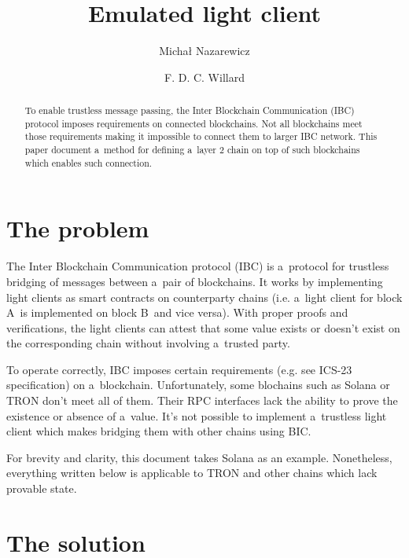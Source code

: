\documentclass[sigplan,screen,authorversion]{acmart}
\begin{document}
\title{Emulated light client}

\author{Michał Nazarewicz}

\author{F. D. C. Willard}

\renewcommand{\shortauthors}{Nazarewicz, et al.}

\begin{abstract}
  To enable trustless message passing, the Inter Blockchain
  Communication (IBC) protocol imposes requirements on connected
  blockchains.  Not all blockchains meet those requirements making it
  impossible to connect them to larger IBC network.  This paper
  document a~method for defining a~layer 2 chain on top of such
  blockchains which enables such connection.
\end{abstract}

\maketitle

\section{The problem}

The Inter Blockchain Communication protocol (IBC) is a~protocol for
trustless bridging of messages between a~pair of blockchains.  It
works by implementing light clients as smart contracts on counterparty
chains (i.e. a~light client for block A~is implemented on block B~and
vice versa).  With proper proofs and verifications, the light clients
can attest that some value exists or doesn’t exist on the
corresponding chain without involving a~trusted party.

To operate correctly, IBC imposes certain requirements (e.g. see
ICS-23 specification) on a~blockchain.  Unfortunately, some blochains
such as Solana or TRON don’t meet all of them.  Their RPC interfaces
lack the ability to prove the existence or absence of a~value.  It’s
not possible to implement a~trustless light client which makes
bridging them with other chains using BIC.

For brevity and clarity, this document takes Solana as an example.
Nonetheless, everything written below is applicable to TRON and other
chains which lack provable state.

\section{The solution}
\end{document}
